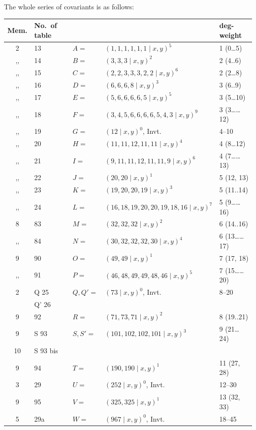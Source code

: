 \documentclass[11pt]{article}
\begin{document}
The whole series of covariants is as follows:

\begin{center}
\begin{tabular}{cllll}
Mem. & No.~of table & & & deg-weight \\
\hline
2 & 13 & $A =$ & $(1, 1, 1, 1, 1, 1 \mid x, y)^5$ & 1 (0\ldots 5) \\
,, & 14 & $B =$ & $(3, 3, 3 \mid x, y)^2$ & 2 (4..6) \\
,, & 15 & $C =$ & $(2, 2, 3, 3, 3, 2, 2 \mid x, y)^6$ & 2 (2\ldots 8) \\
,, & 16 & $D =$ & $(6, 6, 6, 8 \mid x, y)^3$ & 3 (6..9) \\
,, & 17 & $E =$ & $(5, 6, 6, 6, 6, 5 \mid x, y)^5$ & 3 (5\ldots 10) \\
,, & 18 & $F =$ & $(3, 4, 5, 6, 6, 6, 6, 5, 4, 3 \mid x, y)^9$ & 3 (3\ldots\ldots 12) \\
,, & 19 & $G =$ & $(12 \mid x, y)^0$, Invt. & 4--10 \\
,, & 20 & $H =$ & $(11, 11, 12, 11, 11 \mid x, y)^4$ & 4 (8\ldots 12) \\
,, & 21 & $I =$ & $(9, 11, 11, 12, 11, 11, 9 \mid x, y)^6$ & 4 (7\ldots\ldots 13) \\
,, & 22 & $J =$ & $(20, 20 \mid x, y)^1$ & 5 (12, 13) \\
,, & 23 & $K =$ & $(19, 20, 20, 19 \mid x, y)^3$ & 5 (11..14) \\
,, & 24 & $L =$ & $(16, 18, 19, 20, 20, 19, 18, 16 \mid x, y)^7$ & 5 (9\ldots\ldots 16) \\
8 & 83 & $M =$ & $(32, 32, 32 \mid x, y)^2$ & 6 (14..16) \\
,, & 84 & $N =$ & $(30, 32, 32, 32, 30 \mid x, y)^4$ & 6 (13\ldots\ldots 17) \\
9 & 90 & $O =$ & $(49, 49 \mid x, y)^1$ & 7 (17, 18) \\
,, & 91 & $P =$ & $(46, 48, 49, 49, 48, 46 \mid x, y)^5$ & 7 (15\ldots\ldots 20) \\
2 & Q 25 & $Q, Q' =$ & $(73 \mid x, y)^0$, Invt. & 8--20 \\
  & Q' 26 & & & \\
9 & 92 & $R =$ & $(71, 73, 71 \mid x, y)^2$ & 8 (19..21) \\
9 & S 93 & $S, S' =$ & $(101, 102, 102, 101 \mid x, y)^3$ & 9 (21\ldots 24) \\
10 & S 93 bis & & & \\
9 & 94 & $T =$ & $(190, 190 \mid x, y)^1$ & 11 (27, 28) \\
3 & 29 & $U =$ & $(252 \mid x, y)^0$, Invt. & 12--30 \\
9 & 95 & $V =$ & $(325, 325 \mid x, y)^1$ & 13 (32, 33) \\
5 & 29a & $W =$ & $(967 \mid x, y)^0$, Invt. & 18--45
\end{tabular}
\end{center}
\end{document}
